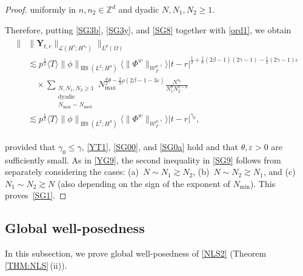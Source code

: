 \documentclass[letterpaper, 11pt,  reqno]{amsart}
\DeclareMathOperator{\med}{med}
\DeclareMathOperator{\HS}{HS}
\newcommand{\1}{\hspace{0.5mm}\textup{I}\hspace{0.5mm}}
\newcommand{\noi}{\noindent}
\newcommand{\Z}{\mathbb{Z}}
\newcommand{\be}{\beta}
\newcommand{\eps}{\varepsilon}
\newcommand{\kk}{\kappa}
\newcommand{\g}{\gamma}
\newcommand{\s}{\sigma}
\newcommand{\ta}{\theta}
\newcommand{\les}{\lesssim}
\newcommand{\ges}{\gtrsim}
\newcommand{\jb}[1]
{\langle #1 \rangle}
\newcommand{\W}{\mathcal{W}}
\newcommand{\Om}{\Omega}
\newcommand{\LOP}{\mathcal{L}}
\newcommand{\YY}{\mathbf{Y}}
\numberwithin{equation}{section}
\numberwithin{theorem}{section}
\begin{document}
\begin{proof}
\noi
uniformly in $n, n_2 \in \Z^d$ and dyadic $N, N_1, N_2 \ge 1$.

Therefore, putting 
\eqref{SG3b}, \eqref{SG3y}, 
and \eqref{SG8} together with \eqref{ord1}, we obtain
\begin{align}
\begin{split}
  \big\|  &  \| \YY_{t,r} \|_{\LOP(H^s;H^{s_0})} \big\|_{L^p(\Om)}\\
& \les 
p^\frac 12 
\jb{T}
\|\phi\|_{\HS(L^2; H^\s)}
\jb{\|\Phi^w\|_{  \W^{\rho,\g}_T}  }
|t- r|^{\frac 12 + \frac 16 (2\be - 1)(2\g-1) - \frac 12  (2\g-1)\eps}\\
& \quad \times \sum_{\substack{N, N_1, N_2 \ge1 \\\text{dyadic}\\
N_{\max}\sim N_{\med}}}  
N_{\max}^{\frac d2 \ta
- \frac 23\rho (2 \be - 1 -3\eps)}
\frac{N^{s_0}}{N_1^{\s} N_2^{s-\kk}}\\
& \les 
p^\frac 12
\jb{T} 
\|\phi\|_{\HS(L^2; H^\s)}
\jb{\|\Phi^w\|_{  \W^{\rho,\g}_T}}  |t- r|^{\g_0}, 
\end{split}
\label{SG9}
\end{align}

\noi
provided that 
$\g_0 \le \g$, 
\eqref{YT1},
\eqref{SG00}, 
  and \eqref{SG0a} 
hold
and that $\ta, \eps > 0$ are sufficiently small.
As in \eqref{YG9},   the second inequality in \eqref{SG9} follows
from separately considering the cases:
 (a)~$N \sim N_1 \ges N_2$, 
(b)~$N \sim N_2 \ges N_1$, 
and 
(c)~$N_1 \sim N_2 \ges N$
(also depending on the sign of the exponent of $N_{\min}$).
This proves~\eqref{SG1}.
\end{proof}

























\subsection{Global well-posedness}
\label{SUBSEC:NLS2}

In this subsection, we prove global well-posedness of \eqref{NLS2}
(Theorem \ref{THM:NLS}\,(ii)).
\end{document}
